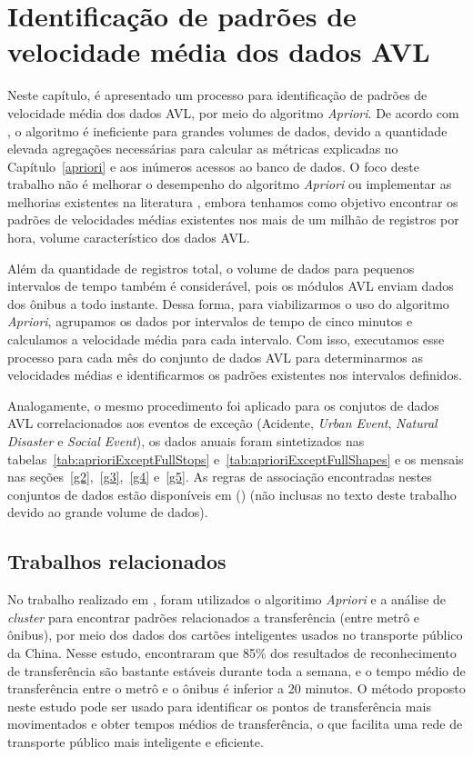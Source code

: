 \documentclass[
	12pt,				%
	oneside,			%
	a4paper,			%
	english,			%
	brazil				%
	]{abntex2ppgsi}
\begin{document}
{{{\chapter{Identificação de padrões de velocidade média dos dados AVL}
\label{expApriori}
Neste capítulo, é apresentado um processo para identificação de padrões de velocidade média dos dados AVL, por meio do algoritmo \textit{Apriori}. De acordo com \cite{xie2008optimization}, o algoritmo é ineficiente para grandes volumes de dados, devido a quantidade elevada agregações necessárias para calcular as métricas explicadas no Capítulo~\ref{apriori} e aos inúmeros acessos ao banco de dados. O foco deste trabalho não é melhorar o desempenho do algoritmo \textit{Apriori} ou implementar as melhorias existentes na literatura \cite{xie2008optimization, zhang2014method}, embora tenhamos como objetivo encontrar os padrões de velocidades médias existentes nos mais de um milhão de registros por hora, volume característico dos dados AVL.

Além da quantidade de registros total, o volume de dados para pequenos intervalos de tempo também é considerável, pois os módulos AVL enviam dados dos ônibus a todo instante. Dessa forma, para viabilizarmos o uso do algoritmo \textit{Apriori}, agrupamos os dados por intervalos de tempo de cinco minutos e calculamos a velocidade média para cada intervalo. Com isso, executamos esse processo para cada mês do conjunto de dados AVL para determinarmos as velocidades médias e identificarmos os padrões existentes nos intervalos definidos.

Analogamente, o mesmo procedimento foi aplicado para os conjutos de dados AVL correlacionados aos eventos de exceção (Acidente, \textit{Urban Event}, \textit{Natural Disaster} e \textit{Social Event}), os dados anuais foram sintetizados nas tabelas~\ref{tab:aprioriExceptFullStops} e~\ref{tab:aprioriExceptFullShapes} e os mensais nas seções~\ref{g2},~\ref{g3},~\ref{g4} e~\ref{g5}. As regras de associação encontradas nestes conjuntos de dados estão disponíveis em \citeauthor{fcas} (\citeyear{fcas}) (não inclusas no texto deste trabalho devido ao  grande volume de dados). 

\section{Trabalhos relacionados}

No trabalho realizado em \cite{zhao2019recognizing}, foram utilizados o algoritimo \textit{Apriori} e a análise de \textit{cluster} para encontrar padrões relacionados a transferência (entre metrô e ônibus), por meio dos dados dos cartões inteligentes usados no transporte público da China. Nesse estudo, encontraram que 85\% dos resultados de reconhecimento de transferência são bastante estáveis durante toda a semana, e o tempo médio de transferência entre o metrô e o ônibus é inferior a 20 minutos. O método proposto neste estudo pode ser usado para identificar os pontos de transferência mais movimentados e obter tempos médios de transferência, o que facilita uma rede de transporte público mais inteligente e eficiente.

}}}
\end{document}
